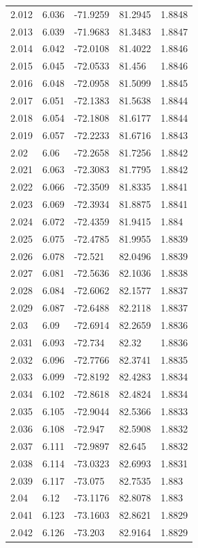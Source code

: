 \begin{tabular}{lllll}
2.012 & 6.036 & -71.9259 & 81.2945 & 1.8848 \\
2.013 & 6.039 & -71.9683 & 81.3483 & 1.8847 \\
2.014 & 6.042 & -72.0108 & 81.4022 & 1.8846 \\
2.015 & 6.045 & -72.0533 & 81.456 & 1.8846 \\
2.016 & 6.048 & -72.0958 & 81.5099 & 1.8845 \\
2.017 & 6.051 & -72.1383 & 81.5638 & 1.8844 \\
2.018 & 6.054 & -72.1808 & 81.6177 & 1.8844 \\
2.019 & 6.057 & -72.2233 & 81.6716 & 1.8843 \\
2.02 & 6.06 & -72.2658 & 81.7256 & 1.8842 \\
2.021 & 6.063 & -72.3083 & 81.7795 & 1.8842 \\
2.022 & 6.066 & -72.3509 & 81.8335 & 1.8841 \\
2.023 & 6.069 & -72.3934 & 81.8875 & 1.8841 \\
2.024 & 6.072 & -72.4359 & 81.9415 & 1.884 \\
2.025 & 6.075 & -72.4785 & 81.9955 & 1.8839 \\
2.026 & 6.078 & -72.521 & 82.0496 & 1.8839 \\
2.027 & 6.081 & -72.5636 & 82.1036 & 1.8838 \\
2.028 & 6.084 & -72.6062 & 82.1577 & 1.8837 \\
2.029 & 6.087 & -72.6488 & 82.2118 & 1.8837 \\
2.03 & 6.09 & -72.6914 & 82.2659 & 1.8836 \\
2.031 & 6.093 & -72.734 & 82.32 & 1.8836 \\
2.032 & 6.096 & -72.7766 & 82.3741 & 1.8835 \\
2.033 & 6.099 & -72.8192 & 82.4283 & 1.8834 \\
2.034 & 6.102 & -72.8618 & 82.4824 & 1.8834 \\
2.035 & 6.105 & -72.9044 & 82.5366 & 1.8833 \\
2.036 & 6.108 & -72.947 & 82.5908 & 1.8832 \\
2.037 & 6.111 & -72.9897 & 82.645 & 1.8832 \\
2.038 & 6.114 & -73.0323 & 82.6993 & 1.8831 \\
2.039 & 6.117 & -73.075 & 82.7535 & 1.883 \\
2.04 & 6.12 & -73.1176 & 82.8078 & 1.883 \\
2.041 & 6.123 & -73.1603 & 82.8621 & 1.8829 \\
2.042 & 6.126 & -73.203 & 82.9164 & 1.8829 \\

\end{tabular}
